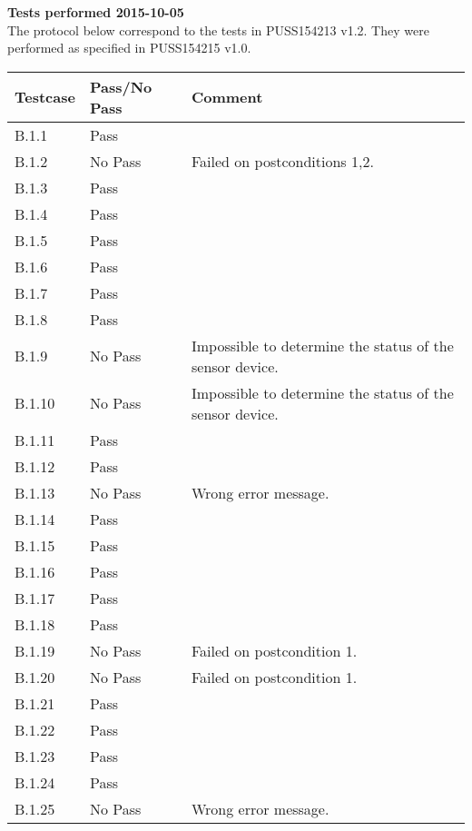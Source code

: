 \renewcommand{\testdate}{2015-10-05}
\textbf{ Tests performed \testdate} \\
The protocol below correspond to the tests in PUSS154213 v1.2. They were performed as specified in PUSS154215 v1.0.
\begin{center}
  		\begin{tabular}{| p{3cm} | p{5cm} | p{5cm} |}
    		\hline
	    	\textbf{Testcase}			& \textbf{Pass/No Pass} 	& \textbf{Comment} \\ \hline
    		B.1.1		 						& Pass 										&  				\\ \hline
    		B.1.2		 						& No Pass 										& Failed on postconditions 1,2. 				 \\	\hline
    		B.1.3		 						& Pass 										& 				 \\	\hline
    		B.1.4		 						& Pass 										& 				 \\	\hline
    		B.1.5		 						& Pass 										& 				 \\	\hline
    		B.1.6		 						& Pass 										& 				 \\	\hline
    		B.1.7		 						& Pass 										& 				 \\	\hline
    		B.1.8		 						& Pass 										& 				 \\	\hline
    		B.1.9		 						& No Pass 										& Impossible to determine the status of the sensor device. 				 \\	\hline
    		B.1.10	 							& No Pass 										& Impossible to determine the status of the sensor device.				 \\	\hline
    		B.1.11	 							& Pass 										& 				 \\	\hline
    		B.1.12	 							& Pass 										& 				 \\	\hline
    		B.1.13	 							& No Pass 										& Wrong error message.				 \\	\hline
    		B.1.14	 							& Pass 										& 				 \\	\hline
    		B.1.15	 							& Pass 										& 				 \\	\hline
    		B.1.16	 							& Pass 										& 				 \\	\hline
    		B.1.17	 							& Pass 										& 				 \\	\hline
    		B.1.18	 							& Pass 										& 				 \\	\hline
    		B.1.19	 							& No Pass 										& Failed on postcondition 1. 				 \\	\hline
    		B.1.20	 							& No Pass 										& Failed on postcondition 1.				 \\	\hline
    		B.1.21	 							& Pass 										& 				 \\	\hline
    		B.1.22	 							& Pass 										& 				 \\	\hline
    		B.1.23	 							& Pass 										& 				 \\	\hline
    		B.1.24	 							& Pass 										& 				 \\	\hline
    		B.1.25	 							& No Pass 										& Wrong error message.				 \\	\hline
 		 \end{tabular}
	\end{center}